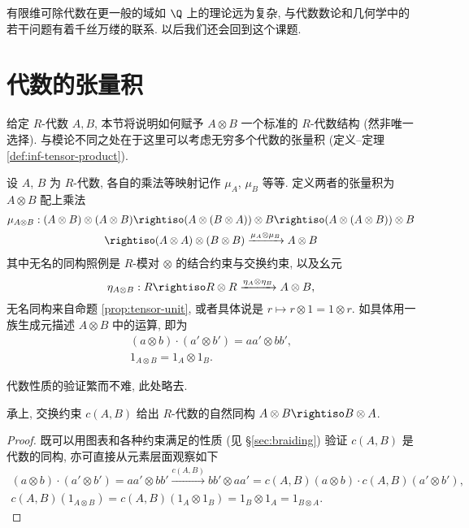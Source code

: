 有限维可除代数在更一般的域如 $\Q$ 上的理论远为复杂, 与代数数论和几何学中的若干问题有着千丝万缕的联系. 以后我们还会回到这个课题.

\section{代数的张量积}\label{sec:algebra-tensor-product}
给定 $R$-代数 $A, B$, 本节将说明如何赋予 $A \otimes B$ 一个标准的 $R$-代数结构 (然非唯一选择). 与模论不同之处在于这里可以考虑无穷多个代数的张量积 (定义--定理 \ref{def:inf-tensor-product}). 

\begin{definition}
	设 $A$, $B$ 为 $R$-代数, 各自的乘法等映射记作 $\mu_A$, $\mu_B$ 等等. 定义两者的张量积为 $A \otimes B$ 配上乘法
	\begin{multline*}
		\mu_{A \otimes B}: (A \otimes B) \otimes (A \otimes B) \rightiso (A \otimes (B \otimes A)) \otimes B \rightiso (A \otimes (A \otimes B)) \otimes B \\
		\rightiso (A \otimes A) \otimes (B \otimes B) \xrightarrow{\mu_A \otimes \mu_B} A \otimes B
	\end{multline*}
	其中无名的同构照例是 $R$-模对 $\otimes$ 的结合约束与交换约束, 以及幺元
	\[ \eta_{A \otimes B}: R \rightiso R \otimes R \xrightarrow{\eta_A \otimes \eta_B} A \otimes B, \]
	无名同构来自命题 \ref{prop:tensor-unit}, 或者具体说是 $r \mapsto r \otimes 1 = 1 \otimes r$. 如具体用一族生成元描述 $A \otimes B$ 中的运算, 即为
	\begin{gather*}
	(a \otimes b) \cdot (a' \otimes b') = aa' \otimes bb', \\
	1_{A \otimes B} = 1_A \otimes 1_B.
	\end{gather*}
\end{definition}
代数性质的验证繁而不难, 此处略去.

\begin{lemma}\label{prop:algebra-otimes-comm}
	承上, 交换约束 $c(A, B)$ 给出 $R$-代数的自然同构 $A \otimes B \rightiso B \otimes A$.
\end{lemma}
\begin{proof}
	既可以用图表和各种约束满足的性质 (见 \S\ref{sec:braiding}) 验证 $c(A, B)$ 是代数的同构, 亦可直接从元素层面观察如下
	\begin{gather*}
	(a \otimes b) \cdot (a' \otimes b') = aa' \otimes bb' \xrightarrow{c(A, B)} bb' \otimes aa' = c(A,B)(a \otimes b) \cdot c(A,B)(a' \otimes b'), \\
	c(A,B)(1_{A \otimes B}) = c(A,B)(1_A \otimes 1_B) = 1_B \otimes 1_A = 1_{B \otimes A}.
	\end{gather*}
\end{proof}

